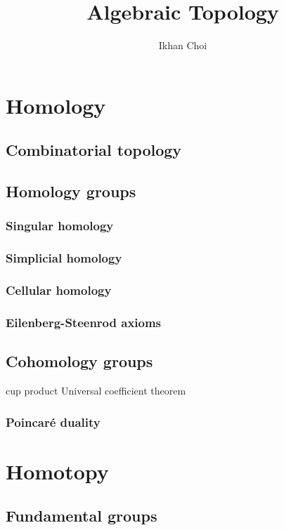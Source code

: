 \documentclass{../../large}
\begin{document}
\title{Algebraic Topology}
\author{Ikhan Choi}
\maketitle
\tableofcontents


\part{Homology}
\chapter{Combinatorial topology}

\chapter{Homology groups}
\section{Singular homology}
\section{Simplicial homology}
\section{Cellular homology}
\section{Eilenberg-Steenrod axioms}

\chapter{Cohomology groups}

cup product
Universal coefficient theorem

\section{Poincar\'e duality}





\part{Homotopy}
\chapter{Fundamental groups}
\end{document}
